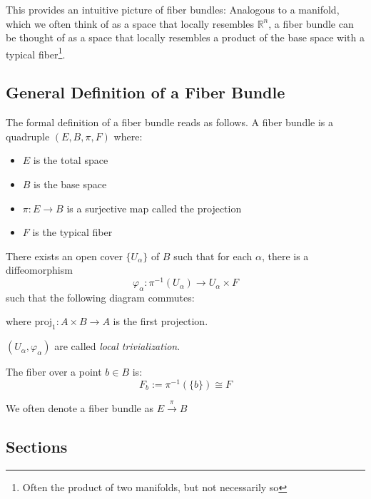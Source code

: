 This provides an intuitive picture of fiber bundles:  
Analogous to a manifold, which we often think of as a space that locally resembles $\mathbb{R}^n$, a fiber bundle can be thought of as a space that locally resembles a product of the base space with a typical fiber\footnote{Often the product of two manifolds, but not necessarily so}.

\subsection*{General Definition of a Fiber Bundle}

The formal definition of a fiber bundle reads as follows.
A fiber bundle is a quadruple $(E, B, \pi, F)$ where:
\begin{itemize}
  \item $E$ is the total space
  \item $B$ is the base space
  \item $\pi: E \to B$ is a surjective map called the projection
  \item $F$ is the typical fiber
\end{itemize}

There exists an open cover $\{U_\alpha\}$ of $B$ such that for each $\alpha$, there is a diffeomorphism
\[
\varphi_\alpha: \pi^{-1}(U_\alpha) \to U_\alpha \times F
\]
such that the following diagram commutes:


\begin{center}
\end{center}


where $\text{proj}_1: A \times B \to A$ is the first projection.

$(U_\alpha, \varphi_\alpha)$ are called \emph{local trivialization}.

The fiber over a point $b \in B$ is:
\[
F_b := \pi^{-1}(\{b\}) \cong F
\]

We often denote a fiber bundle as $E \xrightarrow{\pi} B$

\subsection*{Sections}

